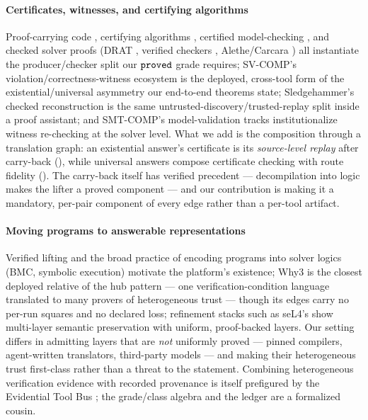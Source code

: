 \paragraph{Certificates, witnesses, and certifying algorithms}
Proof-carrying code \citep{necula1997pcc}, certifying algorithms
\citep{mcconnell2011certifying}, certified model-checking
\citep{namjoshi2001certifying,yu2021certifaiger,niemetz2018btor2}, and
checked solver proofs (DRAT \citep{wetzler2014drat}, verified checkers
\citep{tan2021cakelpr}, Alethe/Carcara \citep{andreotti2023carcara})
all instantiate the producer/checker split our $\mathtt{proved}$ grade requires;
SV-COMP's violation/correctness-witness ecosystem
\citep{beyer2015witnesses} is the deployed, cross-tool form of the
existential/universal asymmetry our end-to-end theorems state;
Sledgehammer's checked reconstruction
\citep{blanchette2013sledgehammer} is the same
untrusted-discovery/trusted-replay split inside a proof assistant; and
SMT-COMP's model-validation tracks \citep{weber2019smtcomp}
institutionalize witness re-checking at the solver level. What we
add is the composition through a translation graph: an existential
answer's certificate is its \emph{source-level replay} after
carry-back (), while universal answers compose
certificate checking with route fidelity (). The
carry-back itself has verified precedent --- decompilation into logic
\citep{myreen2008decompilation} makes the lifter a proved component ---
and our contribution is making it a mandatory, per-pair component of
every edge rather than a per-tool artifact.

\paragraph{Moving programs to answerable representations}
Verified lifting \citep{kamil2016lifting} and the broad practice of
encoding programs into solver logics (BMC, symbolic execution) motivate
the platform's existence; Why3 \citep{filliatre2013why3} is the closest
deployed relative of the hub pattern --- one verification-condition
language translated to many provers of heterogeneous trust --- though
its edges carry no per-run squares and no declared loss; refinement stacks such as seL4's
\citep{klein2009sel4,sewell2013tv} show multi-layer semantic
preservation with uniform, proof-backed layers. Our setting differs in
admitting layers that are \emph{not} uniformly proved --- pinned
compilers, agent-written translators, third-party models --- and making
their heterogeneous trust first-class rather than a threat to the
statement. Combining heterogeneous verification evidence with recorded
provenance is itself prefigured by the Evidential Tool Bus
\citep{rushby2005etb}; the grade/class algebra and the ledger are a
formalized cousin.

